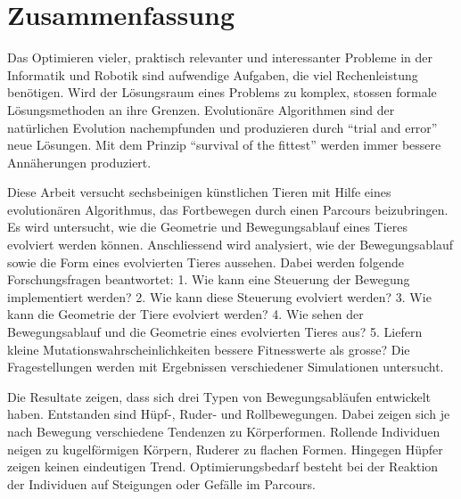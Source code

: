%
%


\chapter{Zusammenfassung}

  Das Optimieren vieler, praktisch relevanter und interessanter Probleme
  in der Informatik und Robotik sind aufwendige Aufgaben, die viel Rechenleistung benötigen.
  Wird der Lösungsraum eines Problems zu komplex, stossen formale Lösungsmethoden an ihre Grenzen.
  Evolutionäre Algorithmen sind der natürlichen Evolution nachempfunden und
  produzieren durch ``trial and error'' neue Lösungen.
  Mit dem Prinzip ``survival of the fittest'' werden immer bessere Annäherungen produziert.

  \medskip

  Diese Arbeit versucht sechsbeinigen künstlichen Tieren mit Hilfe eines evolutionären Algorithmus,
  das Fortbewegen durch einen Parcours beizubringen.
  Es wird untersucht, wie die Geometrie und Bewegungsablauf eines Tieres evolviert werden können.
  Anschliessend wird analysiert, wie der Bewegungsablauf sowie die Form eines evolvierten Tieres aussehen.
  Dabei werden folgende Forschungsfragen beantwortet:
  1. Wie kann eine Steuerung der Bewegung implementiert werden?
  2. Wie kann diese Steuerung evolviert werden?
  3. Wie kann die Geometrie der Tiere evolviert werden?
  4. Wie sehen der Bewegungsablauf und die Geometrie eines evolvierten Tieres aus?
  5. Liefern kleine Mutationswahrscheinlichkeiten bessere Fitnesswerte als grosse?
  Die Fragestellungen werden mit Ergebnissen verschiedener Simulationen untersucht.

  \medskip

  Die Resultate zeigen, dass sich drei Typen von Bewegungsabläufen entwickelt haben.
  Entstanden sind Hüpf-, Ruder- und Rollbewegungen.
  Dabei zeigen sich je nach Bewegung verschiedene Tendenzen zu Körperformen.
  Rollende Individuen neigen zu kugelförmigen Körpern, Ruderer zu flachen Formen.
  Hingegen Hüpfer zeigen keinen eindeutigen Trend.
  Optimierungsbedarf besteht bei der Reaktion der Individuen auf Steigungen oder Gefälle im Parcours.
